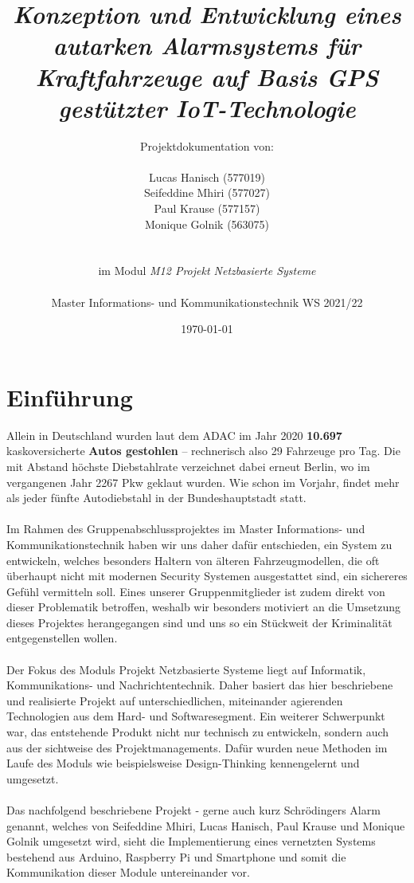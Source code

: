 \documentclass[11pt,a4paper,ngerman]{report}
\date{\today}
\title{ \textbf{\textit{Konzeption und Entwicklung eines autarken Alarmsystems für Kraftfahrzeuge auf Basis GPS gestützter IoT-Technologie}}}
\author{Projektdokumentation von: \\ \\ Lucas Hanisch (577019) \\ Seifeddine Mhiri (577027) \\ Paul Krause (577157)  \\  Monique Golnik (563075) \\ \\ \\ im Modul \textit{ M12 Projekt Netzbasierte Systeme} \\ \\ Master Informations- und Kommunikationstechnik WS 2021/22 }
\begin{document}
	\maketitle
	\tableofcontents
	
\chapter{Einführung}

Allein in Deutschland wurden laut dem ADAC im Jahr 2020 \textbf{10.697} kaskoversicherte \textbf{Autos gestohlen} – rechnerisch also 29 Fahrzeuge pro Tag. Die mit Abstand höchste Diebstahlrate verzeichnet dabei erneut Berlin, wo im vergangenen Jahr 2267 Pkw geklaut wurden. Wie schon im Vorjahr, findet mehr als jeder fünfte Autodiebstahl in der Bundeshauptstadt statt. \cite{Duemmer2021}
\\
\\
Im Rahmen des Gruppenabschlussprojektes im Master Informations- und Kommunikationstechnik haben wir uns daher dafür entschieden, ein System zu entwickeln, welches besonders Haltern von älteren Fahrzeugmodellen, die oft überhaupt nicht mit modernen Security Systemen ausgestattet sind, ein sichereres Gefühl vermitteln soll. Eines unserer Gruppenmitglieder ist zudem direkt von dieser Problematik betroffen, weshalb wir besonders motiviert an die Umsetzung dieses Projektes herangegangen sind und uns so ein Stückweit der Kriminalität entgegenstellen wollen.
\\
\\
Der Fokus des Moduls Projekt Netzbasierte Systeme liegt  auf Informatik, Kommunikations- und  Nachrichtentechnik. Daher basiert das hier beschriebene und realisierte Projekt auf unterschiedlichen, miteinander agierenden Technologien aus dem Hard- und Softwaresegment. Ein weiterer Schwerpunkt war, das entstehende Produkt nicht nur technisch zu entwickeln, sondern auch aus der sichtweise des Projektmanagements. Dafür wurden neue Methoden im Laufe des Moduls wie beispielsweise Design-Thinking kennengelernt und umgesetzt.
\\
\\
Das nachfolgend beschriebene Projekt - gerne auch kurz  Schrödingers Alarm genannt, welches von Seifeddine Mhiri, Lucas Hanisch, Paul Krause und Monique Golnik umgesetzt wird, sieht die Implementierung eines vernetzten Systems bestehend aus Arduino, Raspberry Pi und Smartphone und somit die Kommunikation dieser Module untereinander vor.
\end{document}
